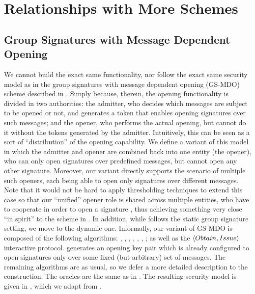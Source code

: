 \section{Relationships with More Schemes}
\label{app:related-extra}

\subsection{Group Signatures with Message Dependent Opening}
\label{sapp:related-models-gsmdo}

We cannot build the exact same functionality, nor follow the exact same security
model as in the group signatures with message dependent opening (GS-MDO) scheme
described in \cite{ehk+19}. Simply because, therein, the opening functionality
is divided in two authorities: the admitter, who decides which messages are
subject to be opened or not, and generates a token that enables opening
signatures over such messages; and the opener, who performs the actual opening,
but cannot do it without the tokens generated by the admitter. Intuitively, this
can be seen as a sort of ``distribution'' of the opening capability. We define
a variant of this model in which the admitter and opener are combined back into
one entity (the opener), who can only open signatures over predefined messages,
but cannot open any other signature. Moreover, our variant directly supports the
scenario of multiple such openers, each being able to open only signatures
over different messages. Note that it would not be hard to apply thresholding
techniques to extend this case so that our ``unified'' opener role is shared
across multiple entities, who have to cooperate in order to open a signature
\needcite, thus achieving something very close ``in spirit'' to the scheme in
\cite{ehk+19}. In addition, while \cite{ehk+19} follows the static group
signature setting, we move to the dynamic one. Informally, our variant of GS-MDO
is composed of the following algorithms: \Setup,
\IKeyGen, \OKeyGen, \UKeyGen, \Sign, \Verify, \Open; as well as the $\langle
Obtain, Issue \rangle$ interactive protocol. \OKeyGen generates an opening
key pair which is already configured to open signatures only over some fixed
(but arbitrary) set of messages. The remaining algorithms are as usual, so we
defer a more detailed description to the construction. The oracles are the same
as in \UAS. The resulting security model is given in ,
which we adapt from \cite{ehk+19}.

